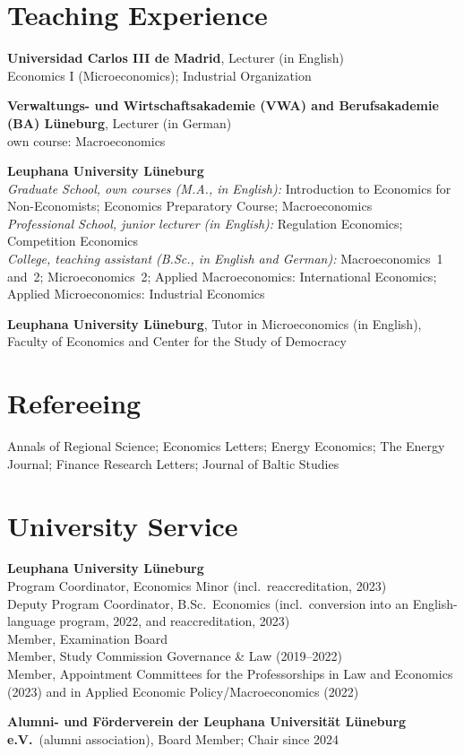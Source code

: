 \documentclass[11pt,a4paper]{article}
\newcommand{\entry}[2]{\item[#1]#2}
\begin{document}
\section{Teaching Experience}
\begin{entries}
  \entry{2025--present}{\textbf{Universidad Carlos III de Madrid}, Lecturer (in English)\\
    Economics I (Microeconomics); Industrial Organization}
  \entry{2022--present}{\textbf{Verwaltungs- und Wirtschaftsakademie (VWA) and Berufsakademie (BA) Lüneburg},
    Lecturer (in German)\\
    own course: Macroeconomics}
  \entry{2019--2025}{\textbf{Leuphana University Lüneburg}\\
    \textit{Graduate School, own courses (M.A., in English):} Introduction to Economics for
      Non-Economists; Economics Preparatory Course; Macroeconomics\\
    \textit{Professional School, junior lecturer (in English):} Regulation Economics; Competition Economics\\
    \textit{College, teaching assistant (B.Sc., in English and German):} Macroeconomics~1 and~2;
      Microeconomics~2; Applied Macroeconomics: International Economics;
      Applied Microeconomics: Industrial Economics}
  \entry{2016--2018}{\textbf{Leuphana University Lüneburg}, Tutor in Microeconomics (in English),
    Faculty of Economics and Center for the Study of Democracy}
\end{entries}

\section{Refereeing}
\begin{entries}
  \entry{}{Annals of Regional Science; Economics Letters; Energy Economics; The Energy Journal;
    Finance Research Letters; Journal of Baltic Studies}
\end{entries}

\section{University Service}
\begin{entries}
  \entry{2019--2025}{\textbf{Leuphana University Lüneburg}\\
    Program Coordinator, Economics Minor (incl.\ reaccreditation, 2023)\\
    Deputy Program Coordinator, B.Sc.\ Economics (incl.\ conversion into an
      English-language program, 2022, and reaccreditation, 2023)\\
    Member, Examination Board\\
    Member, Study Commission Governance \& Law (2019--2022)\\
    Member, Appointment Committees for the Professorships in Law and Economics (2023) and in
      Applied Economic Policy/Macroeconomics (2022)}
  \entry{2022--present}{\textbf{Alumni- und Förderverein der Leuphana Universität Lüneburg e.V.}\
    (alumni association), Board Member; Chair since 2024}
\end{entries}
\end{document}
